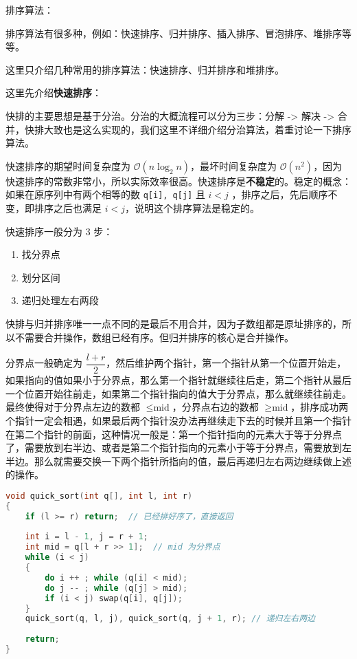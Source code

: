 
排序算法：

排序算法有很多种，例如：快速排序、归并排序、插入排序、冒泡排序、堆排序等等。

这里只介绍几种常用的排序算法：快速排序、归并排序和堆排序。

这里先介绍\textbf{快速排序}：

快排的主要思想是基于分治。分治的大概流程可以分为三步：分解 -> 解决 -> 合并，快排大致也是这么实现的，我们这里不详细介绍分治算法，着重讨论一下排序算法。

快速排序的期望时间复杂度为 $\mathcal{O}(n \log_2 n)$，最坏时间复杂度为 $\mathcal{O}(n^2)$，因为快速排序的常数非常小，所以实际效率很高。快速排序是\textbf{不稳定}的。稳定的概念：如果在原序列中有两个相等的数 \verb`q[i], q[j]` 且 $i < j$ ，排序之后，先后顺序不变，即排序之后也满足 $i < j$，说明这个排序算法是稳定的。

快速排序一般分为 $3$ 步：
\begin{enumerate}
\item 找分界点
\item 划分区间
\item 递归处理左右两段
\end{enumerate}

快排与归并排序唯一一点不同的是最后不用合并，因为子数组都是原址排序的，所以不需要合并操作，数组已经有序。但归并排序的核心是合并操作。

分界点一般确定为 $\dfrac{l+r}{2}$，然后维护两个指针，第一个指针从第一个位置开始走，如果指向的值如果小于分界点，那么第一个指针就继续往后走，第二个指针从最后一个位置开始往前走，如果第二个指针指向的值大于分界点，那么就继续往前走。最终使得对于分界点左边的数都 $\leq \text{mid}$，分界点右边的数都 $\geq \text{mid}$，排序成功两个指针一定会相遇，如果最后两个指针没办法再继续走下去的时候并且第一个指针在第二个指针的前面，这种情况一般是：第一个指针指向的元素大于等于分界点了，需要放到右半边、或者是第二个指针指向的元素小于等于分界点，需要放到左半边。那么就需要交换一下两个指针所指向的值，最后再递归左右两边继续做上述的操作。


\begin{lstlisting}[language=cpp]
void quick_sort(int q[], int l, int r)
{
    if (l >= r) return;  // 已经排好序了，直接返回
		
    int i = l - 1, j = r + 1;
    int mid = q[l + r >> 1];  // mid 为分界点
    while (i < j)
    {
        do i ++ ; while (q[i] < mid);
        do j -- ; while (q[j] > mid);
        if (i < j) swap(q[i], q[j]);
    }
    quick_sort(q, l, j), quick_sort(q, j + 1, r); // 递归左右两边
    
    return;
}

\end{lstlisting}


